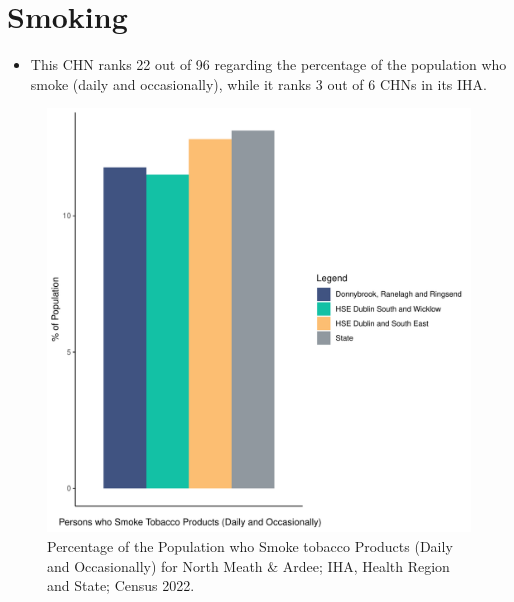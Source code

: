 \documentclass{article}
\begin{document}
\pagebreak

\section{Smoking}\label{sect:Smoking}
\begin{itemize}
\item This CHN ranks  22 out of 96 regarding the percentage of the population who smoke (daily and occasionally), while it ranks   3 out of 6 CHNs in its IHA.
\end{itemize}
\begin{figure}[H]
	\centering
	\includegraphics[width = 120mm]{../figures/SmokingED.pdf}
	\caption{Percentage of the Population who Smoke tobacco Products (Daily and Occasionally) for North Meath & Ardee; IHA, Health Region and State; Census 2022.}
	\label{fig:2ae19629-1a6a-13a3-e055-000000000001}
	\end{figure}
	
\end{document}
